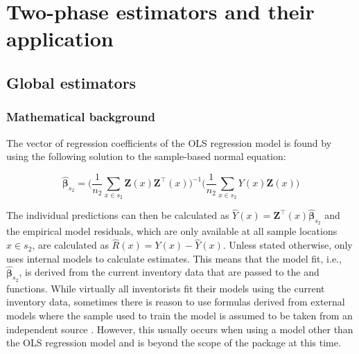 \newpage



\section{Two-phase estimators and their application}
\label{sec:twophase_and_appl}


\subsection{Global estimators}
\label{sec:twophase_globest}

\subsubsection{Mathematical background}

The vector of regression coefficients of the OLS regression model is found by using the following solution to the sample-based normal equation:

\begin{equation}\label{normequ_simple}
  \hat{\pmb{\beta}}_{s_2}=\Big(\frac{1}{n_2}\sum_{x\in{s_2}}\pmb{Z}(x)\pmb{Z}^{\top}(x) \Big)^{-1} \Big(\frac{1}{n_2}\sum_{x\in{s_2}}Y(x)\pmb{Z}(x)\Big)
\end{equation}

The individual predictions can then be calculated as $\hat{Y}(x)=\pmb{Z}^{\top}(x)\hat{\pmb{\beta}}_{s_2}$ and the empirical model residuals, which are only available at all sample locations $x \in s_2$, are calculated as $\hat{R}(x)=Y(x)-\hat{Y}(x)$. Unless stated otherwise,  only uses internal models to calculate estimates. This means that the model fit, i.e., $\hat{\pmb{\beta}}_{s_2}$, is derived from the current inventory data that are passed to the  and  functions.  While virtually all inventorists fit their models using the current inventory data, sometimes there is reason to use formulas derived from external models where the sample used to train the model is assumed to be taken from an independent source \citep{massey2015a}. However, this usually occurs when using a model other than the OLS regression model and is beyond the scope of the package at this time.\par

